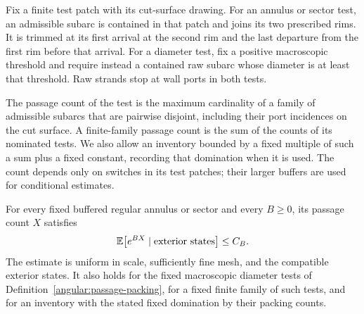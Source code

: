 \begin{definition}\label{angular:passage-packing}
Fix a finite test patch with its cut-surface drawing.  For an annulus or
sector test, an admissible subarc is contained in that patch and joins its
two prescribed rims.  It is trimmed at its first arrival at the second rim
and the last departure from the first rim before that arrival.  For a diameter test,
fix a positive macroscopic threshold and require instead a contained
raw subarc whose diameter is at least that threshold.  Raw strands stop
at wall ports in both tests.

The passage count of the test is the maximum cardinality of a family of
admissible subarcs that are pairwise disjoint, including their port
incidences on the cut surface.  A finite-family passage count is the sum
of the counts of its nominated tests.  We also allow an inventory bounded
by a fixed multiple of such a sum plus a fixed constant, recording that
domination when it is used.  The count depends only on switches in its
test patches; their larger buffers are used for conditional estimates.
\end{definition}

\begin{proposition}
\label{prop:passage-moments}
For every fixed buffered regular annulus or sector and every
\(B\ge0\), its passage count \(X\) satisfies
\begin{equation}\label{angular:passage-moment}
 \mathbb E\!\left[e^{BX}\mid\text{exterior states}\right]\le C_B.
\end{equation}
The estimate is uniform in scale, sufficiently fine mesh, and the
compatible exterior states.  It also holds for the fixed macroscopic
diameter tests of Definition~\ref{angular:passage-packing}, for a fixed
finite family of such tests, and for an inventory with the stated fixed
domination by their packing counts.
\end{proposition}


